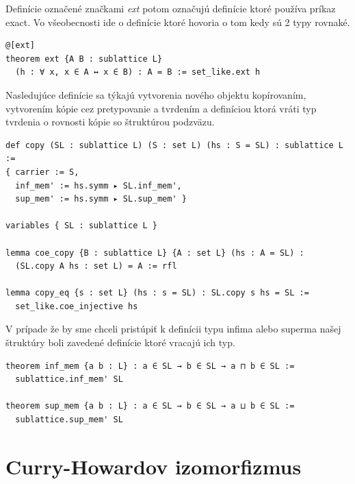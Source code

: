 \documentclass[a4paper,10pt,oneside]{report}%
\begin{document}
    Definície označené značkami \emph{ext} potom označujú definície ktoré
používa príkaz exact. Vo všeobecnosti ide o definície ktoré hovoria o tom
kedy sú 2 typy rovnaké.
\begin{lstlisting}
@[ext]
theorem ext {A B : sublattice L}
  (h : ∀ x, x ∈ A ↔ x ∈ B) : A = B := set_like.ext h
\end{lstlisting}
    Nasledujúce definície sa týkajú vytvorenia nového objektu kopírovaním,
vytvorením kópie cez pretypovanie a tvrdením a definíciou ktorá vráti typ
tvrdenia o rovnosti kópie so štruktúrou podzväzu.
\begin{lstlisting}
def copy (SL : sublattice L) (S : set L) (hs : S = SL) : sublattice L :=
{ carrier := S,
  inf_mem' := hs.symm ▸ SL.inf_mem',
  sup_mem' := hs.symm ▸ SL.sup_mem' }

variables { SL : sublattice L }

lemma coe_copy {B : sublattice L} {A : set L} (hs : A = SL) :
  (SL.copy A hs : set L) = A := rfl

lemma copy_eq {s : set L} (hs : s = SL) : SL.copy s hs = SL :=
  set_like.coe_injective hs
\end{lstlisting}
    V prípade že by sme chceli pristúpiť k definícii typu infima alebo superma
našej štruktúry boli zavedené definície ktoré vracajú ich typ.
\begin{lstlisting}
theorem inf_mem {a b : L} : a ∈ SL → b ∈ SL → a ⊓ b ∈ SL :=
  sublattice.inf_mem' SL

theorem sup_mem {a b : L} : a ∈ SL → b ∈ SL → a ⊔ b ∈ SL :=
  sublattice.sup_mem' SL
\end{lstlisting}

\chapter{Curry-Howardov izomorfizmus}
\end{document}

